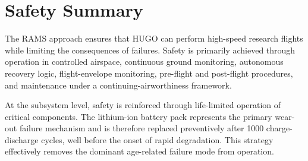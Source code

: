 \section{Safety Summary}
\label{sec:safety}

The RAMS approach ensures that HUGO can perform high-speed research flights while limiting the consequences of failures. Safety is primarily achieved through operation in controlled airspace, continuous ground monitoring, autonomous recovery logic, flight-envelope monitoring, pre-flight and post-flight procedures, and maintenance under a continuing-airworthiness framework. %

At the subsystem level, safety is reinforced through life-limited operation of critical components. The lithium-ion battery pack represents the primary wear-out failure mechanism and is therefore replaced preventively after 1000 charge-discharge cycles, well before the onset of rapid degradation. This strategy effectively removes the dominant age-related failure mode from operation.


